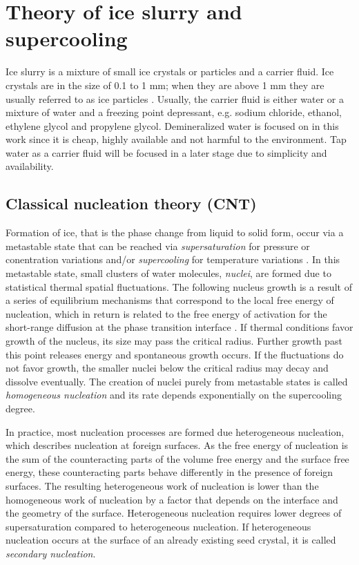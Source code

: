 
\section{Theory of ice slurry and supercooling}
\label{chapter_theory}

Ice slurry is a mixture of small ice crystals or particles and a carrier fluid. Ice crystals are in the size of 0.1 to 1 mm; when they are above 1 mm they are usually referred to as ice particles \citep{kauffeld_ice_2010}.
Usually, the carrier fluid is either water or a mixture of water and a freezing point depressant, e.g. sodium chloride, ethanol, ethylene glycol and propylene glycol. Demineralized water is focused on in this work since it is cheap, highly available and not harmful to the environment. Tap water as a carrier fluid will be focused in a later stage due to simplicity and availability.


\subsection{Classical nucleation theory (\acs{CNT})}

Formation of ice, that is the phase change from liquid to solid form, occur via a metastable state that can be reached via \emph{supersaturation} for pressure or conentration variations and/or \emph{supercooling} for temperature variations \citep{kauffeld_handbooks_2005}. In this metastable state, small clusters of water molecules, \emph{nuclei}, are formed due to statistical thermal spatial fluctuations. The following nucleus growth is a result of a series of equilibrium mechanisms that correspond to the local free energy of nucleation, which in return is related to the free energy of activation for the short-range diffusion at the phase transition interface \citep{turnbull_rate_1949}. If thermal conditions favor growth of the nucleus, its size may pass the critical radius. Further growth past this point releases energy and spontaneous growth occurs. If the fluctuations do not favor growth, the smaller nuclei below the critical radius may decay and dissolve eventually. The creation of nuclei purely from metastable states is called \emph{homogeneous nucleation} and its rate depends exponentially on the supercooling degree. 

In practice, most nucleation processes are formed due heterogeneous nucleation, which describes nucleation at foreign surfaces. As the free energy of nucleation is the sum of the counteracting parts of the volume free energy and the surface free energy, these counteracting parts behave differently in the presence of foreign surfaces. The resulting heterogeneous work of nucleation  is lower than the homogeneous work of nucleation by a factor that depends on the interface and the geometry of the surface. Heterogeneous nucleation requires lower degrees of supersaturation compared to heterogeneous nucleation. If heterogeneous nucleation occurs at the surface of an already existing seed crystal, it is called \emph{secondary nucleation}.

